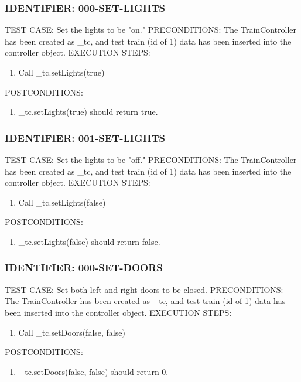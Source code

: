 \documentclass{scrreprt}
\begin{document}
\subsubsection{IDENTIFIER: 000-SET-LIGHTS}
TEST CASE: Set the lights to be "on."
PRECONDITIONS: The TrainController has been created as _tc, and test train (id of 1) data has been inserted into the controller object.
EXECUTION STEPS:
\begin{enumerate}
	\item Call _tc.setLights(true)
\end{enumerate}
POSTCONDITIONS:
\begin{enumerate}
	\item _tc.setLights(true) should return true.
\end{enumerate}

\subsubsection{IDENTIFIER: 001-SET-LIGHTS}
TEST CASE: Set the lights to be "off."
PRECONDITIONS: The TrainController has been created as _tc, and test train (id of 1) data has been inserted into the controller object.
EXECUTION STEPS:
\begin{enumerate}
	\item Call _tc.setLights(false)
\end{enumerate}
POSTCONDITIONS:
\begin{enumerate}
	\item _tc.setLights(false) should return false.
\end{enumerate}

\subsubsection{IDENTIFIER: 000-SET-DOORS}
TEST CASE: Set both left and right doors to be closed.
PRECONDITIONS: The TrainController has been created as _tc, and test train (id of 1) data has been inserted into the controller object.
EXECUTION STEPS:
\begin{enumerate}
	\item Call _tc.setDoors(false, false)
\end{enumerate}
POSTCONDITIONS:
\begin{enumerate}
	\item _tc.setDoors(false, false) should return 0.
\end{enumerate}
\end{document}
